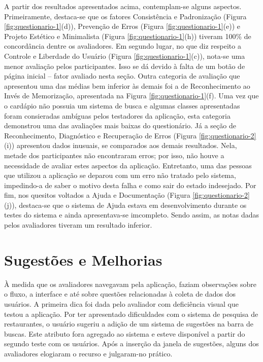 A partir dos resultados apresentados acima, contemplam-se alguns aspectos. Primeiramente, destaca-se que os fatores Consistência e Padronização (Figura \ref{fig:questionario-1}(d)), Prevenção de Erros (Figura \ref{fig:questionario-1}(e)) e Projeto Estético e Minimalista (Figura \ref{fig:questionario-1}(h)) tiveram 100\% de concordância dentre os avaliadores. Em segundo lugar, no que diz respeito a Controle e Liberdade do Usuário (Figura \ref{fig:questionario-1}(c)), nota-se uma menor avaliação pelos participantes. Isso se dá devido à falta de um botão de página inicial -- fator avaliado nesta seção. Outra categoria de avaliação que apresentou uma das médias bem inferior às demais foi a de Reconhecimento ao Invés de Memorização, apresentada na Figura \ref{fig:questionario-1}(f). Uma vez que o cardápio não possuia um sistema de busca e algumas classes apresentadas foram consieradas ambíguas pelos testadores da aplicação, esta categoria demonstrou uma das avaliações mais baixas do questionário. Já a seção de Reconhecimento, Diagnóstico e Recuperação de Erros (Figura \ref{fig:questionario-2}(i)) apresentou dados inusuais, se comparados aos demais resultados. Nela, metade dos participantes não encontraram erros; por isso, não houve a necessidade de avaliar estes aspectos da aplicação. Entretanto, uma das pessoas que utilizou a aplicação se deparou com um erro não tratado pelo sistema, impedindo-a de saber o motivo desta falha e como sair do estado indesejado. Por fim, nos quesitos voltados a Ajuda e Documentação (Figura \ref{fig:questionario-2}(j)), destaca-se que o sistema de Ajuda estava em desenvolvimento durante os testes do sistema e ainda apresentava-se imcompleto. Sendo assim, as notas dadas pelos avaliadores tiveram um resultado inferior.

\section{\label{sec:sugestoes}Sugestões e Melhorias}

À medida que os avaliadores navegavam pela aplicação, faziam observações sobre o fluxo, a interface e até sobre questões relacionadas à coleta de dados dos usuários. A primeira dica foi dada pelo avaliador com deficiência visual que testou a aplicação. Por ter apresentado dificuldades com o sistema de pesquisa de restaurantes, o usuário sugeriu a adição de um sistema de sugestões na barra de buscas. Este atributo fora agregado ao sistema e esteve disponível a partir do segundo teste com os usuários. Após a inserção da janela de sugestões, alguns dos avaliadores elogiaram o recurso e julgaram-no prático.

